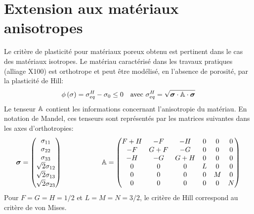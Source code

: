 \documentclass[french,12pt]{exam}
\begin{document}
\section{Extension aux matériaux anisotropes}
Le critère de plasticité pour matériaux poreux obtenu est pertinent dans le cas des matériaux isotropes. Le matériau caractérisé dans les travaux pratiques (alliage X100) est orthotrope et peut être modélisé, en l'absence de porosité, par la plasticité de Hill:
\begin{equation}
  \phi\left( \sigma   \right) =  \sigma_{eq}^H - \sigma_0 \leq 0 \quad \text{avec } \sigma_{eq}^H = \sqrt{ \boldsymbol{\sigma} \cdot \mathbb{A} \cdot \boldsymbol{\sigma}}
  \label{eq100}
\end{equation}
Le tenseur $\mathbb{A}$ contient les informations concernant l'anisotropie du matériau. En notation de Mandel, ces tenseurs sont représentés par les matrices suivantes dans les axes d'orthotropies:
\begin{equation}
  \boldsymbol{\sigma} = \begin{pmatrix}
    \sigma_{11} \\
    \sigma_{22} \\
    \sigma_{33} \\
    \sqrt{2}\sigma_{12} \\
    \sqrt{2}\sigma_{13} \\
    \sqrt{2}\sigma_{23} \\
  \end{pmatrix} \hspace{2cm}
  \mathbb{A} = \begin{pmatrix}
    F + H & -F & -H & 0 & 0 & 0 \\
    -F & G+ F & -G & 0 & 0 & 0 \\
    -H & -G & G+H & 0 & 0 & 0 \\
    0 & 0 & 0 & L & 0 & 0 \\
    0 & 0 & 0 & 0 & M & 0 \\
    0 & 0 & 0 & 0 & 0 & N \\
    \end{pmatrix}
\end{equation}
Pour $F = G = H = 1/2$ et $L = M = N = 3/2$, le critère de Hill correspond au critère de von Mises.
\end{document}
